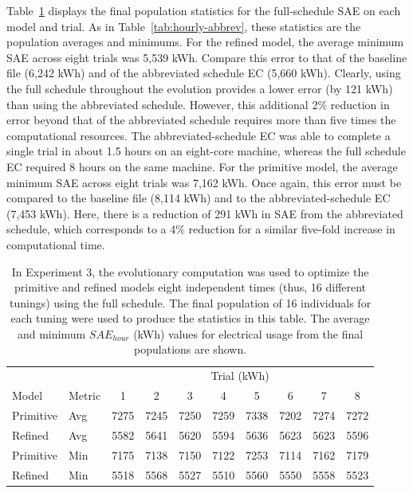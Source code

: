 \documentclass[preprint, review, 12pt]{elsarticle}
\begin{document}
Table~\ref{tab:hourly-full} displays the final population statistics for the full-schedule SAE on each model and trial. As in Table~\ref{tab:hourly-abbrev}, these statistics are the population averages and minimums. For the refined model, the average minimum SAE across eight trials was 5,539 kWh. Compare this error to that of the baseline file (6,242 kWh) and of the abbreviated schedule EC (5,660 kWh). Clearly, using the full schedule throughout the evolution provides a lower error (by 121 kWh) than using the abbreviated schedule. However, this additional 2\% reduction in error beyond that of the abbreviated schedule requires more than five times the computational resources. The abbreviated-schedule EC was able to complete a single trial in about 1.5 hours on an eight-core machine, whereas the full schedule EC required 8 hours on the same machine. For the primitive model, the average minimum SAE across eight trials was 7,162 kWh. Once again, this error must be compared to the baseline file (8,114 kWh) and to the abbreviated-schedule EC (7,453 kWh). Here, there is a reduction of 291 kWh in SAE from the abbreviated schedule, which corresponds to a 4\% reduction for a similar five-fold increase in computational time.

\begin{table}[tbp]
\centering
\caption{In Experiment 3, the evolutionary computation was used to optimize the primitive and refined models eight independent times (thus, 16 different tunings) using the full schedule. The final population of 16 individuals for each tuning were used to produce the statistics in this table. The average and minimum $SAE_{hour}$ (kWh) values for electrical usage from the final populations are shown.}
\label{tab:hourly-full}
\begin{tabular}{llcccccccc}
\toprule
 &  & \multicolumn{8}{c}{Trial (kWh)}\\
Model & Metric & 1 & 2 & 3 & 4 & 5 & 6 & 7 & 8\\
\midrule
Primitive & Avg & 7275 & 7245 & 7250 & 7259 & 7338 & 7202 & 7274 & 7272\\\rowcolor{DarkRow}
Refined   & Avg & 5582 & 5641 & 5620 & 5594 & 5636 & 5623 & 5623 & 5596\\
Primitive & Min & 7175 & 7138 & 7150 & 7122 & 7253 & 7114 & 7162 & 7179\\\rowcolor{DarkRow}
Refined   & Min & 5518 & 5568 & 5527 & 5510 & 5560 & 5550 & 5558 & 5523\\
\bottomrule
\end{tabular}
\end{table}
\end{document}
